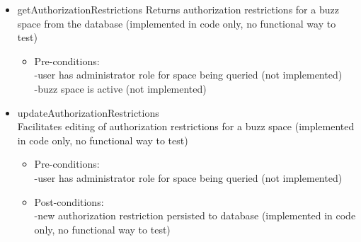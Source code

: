 \begin {itemize}
\begin {itemize}
\item{getAuthorizationRestrictions}
Returns authorization restrictions for a buzz space from the database (implemented in code only, no functional way to test) \\

\begin {itemize}
\item Pre-conditions: \\
-user has administrator role for space being queried (not implemented)\\
        -buzz space is active (not implemented)\\
         
\end{itemize}


\item {updateAuthorizationRestrictions}\\
Facilitates editing of authorization restrictions for a buzz space (implemented in code only, no functional way to test)
\begin {itemize}
\item Pre-conditions: \\
-user has administrator role for space being queried (not implemented)\\
        
\item Post-conditions: \\
  -new authorization restriction persisted to database (implemented in code only, no functional way to test)
\end{itemize}



\end{itemize}

\end{itemize}
